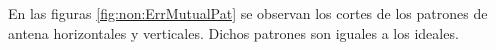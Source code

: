 En las figuras \ref{fig:non:ErrMutualPat} se observan los cortes de los patrones de antena horizontales y 
verticales. Dichos patrones son iguales a los ideales. 
\begin{figure}[H]
	\centering
 	


\end{figure}
